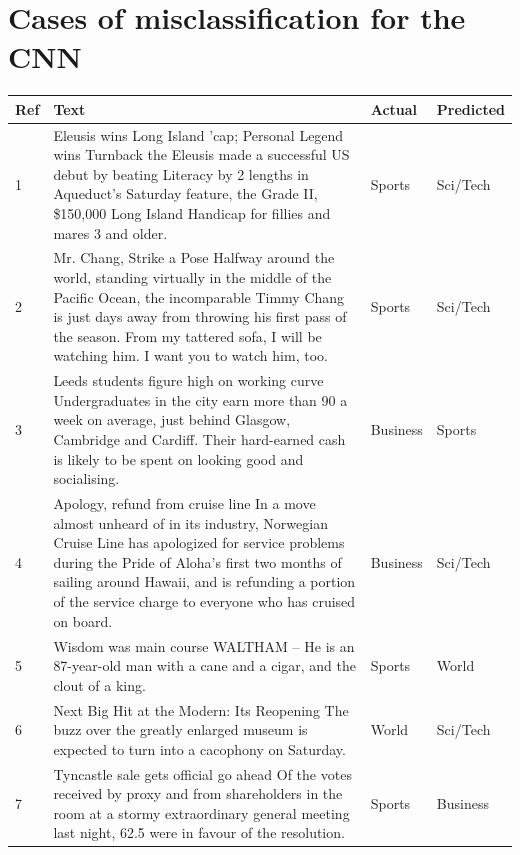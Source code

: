 \documentclass[12pt,a4paper,english]{article}
\begin{document}
\section{Cases of misclassification for the CNN}
\begin{table}[H]
\begin{longtable}{| m{2em} | m{25em} | m{5em} | m{5em} |}
        \hline
        \textbf{Ref} & \textbf{Text} & \textbf{Actual} & \textbf{Predicted} \\ \hline
        1 & Eleusis wins Long Island 'cap; Personal Legend wins Turnback the Eleusis made a successful US debut by beating Literacy by 2 lengths in Aqueduct's Saturday feature, the Grade II, \$150,000 Long Island Handicap for fillies and mares 3 and older. & Sports & Sci/Tech \\ \hline
         
        2 & Mr. Chang, Strike a Pose Halfway around the world, standing virtually in the middle of the Pacific Ocean, the incomparable Timmy Chang is just days away from throwing his first pass of the season. From my tattered sofa, I will be watching him. I want you to watch him, too. & Sports & Sci/Tech \\ \hline
        
        3 & Leeds students figure high on working curve Undergraduates in the city earn more than 90 a week on average, just behind Glasgow, Cambridge and Cardiff. Their hard-earned cash is likely to be spent on looking good and socialising. & Business & Sports \\ \hline
        
        4 & Apology, refund from cruise line In a move almost unheard of in its industry, Norwegian Cruise Line has apologized for service problems during the Pride of Aloha's first two months of sailing around Hawaii, and is refunding a portion of the service charge to everyone who has cruised on board. & Business & Sci/Tech \\ \hline
        
        5 & Wisdom was main course WALTHAM -- He is an 87-year-old man with a cane and a cigar, and the clout of a king. & Sports & World \\ \hline
        
        6 & Next Big Hit at the Modern: Its Reopening The buzz over the greatly enlarged museum is expected to turn into a cacophony on Saturday. & World & Sci/Tech \\ \hline
        
        7 & Tyncastle sale gets official go ahead Of the votes received by proxy and from shareholders in the room at a stormy extraordinary general meeting last night, 62.5 were in favour of the resolution. & Sports & Business \\ \hline
        

\end{longtable}
\end{table}
\end{document}
